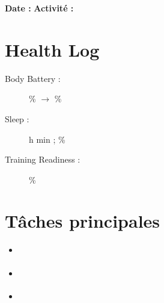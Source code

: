\documentclass[a5paper,10pt]{article}
\begin{document}
\noindent
{\LARGE \textbf{Date :} \underline{\hspace{2.5cm}}} \hfill
{\large \textbf{Activité :} \underline{\hspace{4.5cm}}}

\vspace{0.5em}

\begin{multicols}{2} %

\section*{Health Log}
\begin{description}
	\item[Body Battery :] \underline{\hspace{0.8cm}} \% $\rightarrow$ \underline{\hspace{0.8cm}} \%
	\item[Sleep :] \underline{\hspace{0.875cm}} h \underline{\hspace{0.875cm}} min ; \underline{\hspace{0.875cm}} \%
	\item[Training Readiness :] \underline{\hspace{1.65cm}} \%
\end{description}

\vfill %
\columnbreak %

\section*{Tâches principales}
\begin{itemize}[label={\textcolor{darkgray}{\Square}}, leftmargin=0.5cm, labelsep=0.3cm]
    \item \underline{\hspace{5.5cm}}
    \item \underline{\hspace{5.5cm}}
    \item \underline{\hspace{5.5cm}}
\end{itemize}

\vfill

\end{multicols} %

\end{document}
